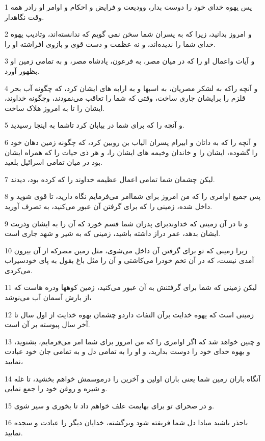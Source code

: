 \par 1 پس یهوه خدای خود را دوست بدار، وودیعت و فرایض و احکام و اوامر او رادر همه وقت نگاهدار.
\par 2 و امروز بدانید، زیرا که به پسران شما سخن نمی گویم که ندانسته‌اند، وتادیب یهوه خدای شما را ندیده‌اند، و نه عظمت و دست قوی و بازوی افراشته او را.
\par 3 و آیات واعمال او را که در میان مصر، به فرعون، پادشاه مصر، و به تمامی زمین او بظهور آورد.
\par 4 و آنچه راکه به لشکر مصریان، به اسبها و به ارابه های ایشان کرد، که چگونه آب بحر قلزم را برایشان جاری ساخت، وقتی که شما را تعاقب می‌نمودند، وچگونه خداوند، ایشان را تا به امروز هلاک ساخت.
\par 5 و آنچه را که برای شما در بیابان کرد تاشما به اینجا رسیدید.
\par 6 و آنچه را که به داتان و ابیرام پسران الیاب بن روبین کرد، که چگونه زمین دهان خود را گشوده، ایشان را و خاندان وخیمه های ایشان را، و هر ذی حیات را که همراه ایشان بود در میان تمامی اسرائیل بلعید.
\par 7 لیکن چشمان شما تمامی اعمال عظیمه خداوند را که کرده بود، دیدند.
\par 8 پس جمیع اوامری را که من امروز برای شماامر می‌فرمایم نگاه دارید، تا قوی شوید و داخل شده، زمینی را که برای گرفتن آن عبور می‌کنید، به تصرف آورید.
\par 9 و تا در آن زمینی که خداوندبرای پدران شما قسم خورد که آن را به ایشان وذریت ایشان بدهد، عمر دراز داشته باشید، زمینی که به شیر و شهد جاری است.
\par 10 زیرا زمینی که تو برای گرفتن آن داخل می‌شوی، مثل زمین مصرکه از آن بیرون آمدی نیست، که در آن تخم خودرا می‌کاشتی و آن را مثل باغ بقول به پای خودسیراب می‌کردی.
\par 11 لیکن زمینی که شما برای گرفتنش به آن عبور می‌کنید، زمین کوهها ودره هاست که از بارش آسمان آب می‌نوشد،
\par 12 زمینی است که یهوه خدایت برآن التفات داردو چشمان یهوه خدایت از اول سال تا آخر سال پیوسته بر آن است.
\par 13 و چنین خواهد شد که اگر اوامری را که من امروز برای شما امر می‌فرمایم، بشنوید، و یهوه خدای خود را دوست بدارید، و او را به تمامی دل و به تمامی جان خود عبادت نمایید،
\par 14 آنگاه باران زمین شما یعنی باران اولین و آخرین را درموسمش خواهم بخشید، تا غله و شیره و روغن خود را جمع نمایی.
\par 15 و در صحرای تو برای بهایمت علف خواهم داد تا بخوری و سیر شوی.
\par 16 باحذر باشید مبادا دل شما فریفته شود وبرگشته، خدایان دیگر را عبادت و سجده نمایید.
